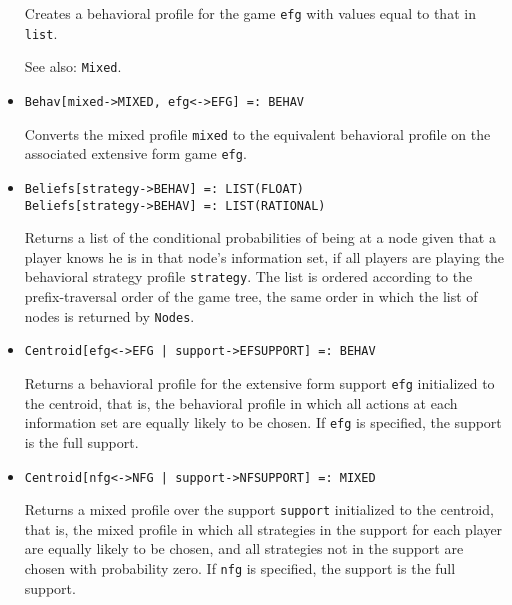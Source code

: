 \begin{itemize}
\bd
Creates a behavioral profile for the game \verb+efg+ with values equal
to that in \verb+list+.  
\item
[See also:] {\tt Mixed}.
\ed

\item
\protect \large \begin{verbatim}
Behav[mixed->MIXED, efg<->EFG] =: BEHAV
\end{verbatim}\normalsize

\bd
Converts the mixed profile \verb+mixed+ to the equivalent
behavioral profile on the associated extensive form game \verb+efg+.
\ed

\item
\protect \large \begin{verbatim}
Beliefs[strategy->BEHAV] =: LIST(FLOAT)
Beliefs[strategy->BEHAV] =: LIST(RATIONAL)
\end{verbatim}\normalsize

\bd
Returns a list of the conditional probabilities of
being at a node given that a player knows he is in that node's information
set, if all players are playing the behavioral strategy profile
\verb+strategy+.  The list is ordered according to the prefix-traversal
order of the game tree, the same order in which the list of nodes is
returned by {\tt Nodes}.
\ed



\item
\protect \large \begin{verbatim} 
Centroid[efg<->EFG | support->EFSUPPORT] =: BEHAV
\end{verbatim}\normalsize

\bd
Returns a behavioral profile for the extensive form
support \verb+efg+ initialized to the centroid, that is, the behavioral
profile in which all actions at each information set are equally
likely to be chosen.  If \verb+efg+ is specified, the support is the
full support.  
\ed

\item
\protect \large \begin{verbatim}
Centroid[nfg<->NFG | support->NFSUPPORT] =: MIXED
\end{verbatim}\normalsize

\bd
Returns a mixed profile over the support \verb+support+
initialized to the centroid, that is, the mixed profile in which 
all strategies in the support for each player are equally likely to be
chosen, and all strategies not in the support are chosen with probability
zero.  If \verb+nfg+ is specified, the support is the full support.  
\ed


\end{itemize}
